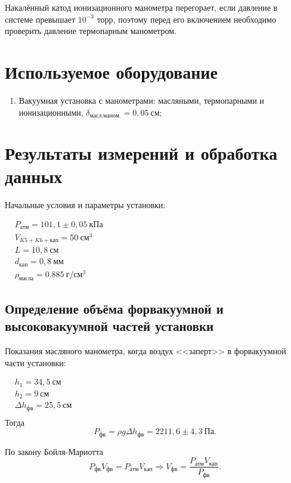 \documentclass[a4paper, 12pt]{article}
\begin{document}
  Накалённый катод ионизационного манометра перегорает, если давление в системе превышает $10^{-3}$ торр, поэтому перед его включением необходимо проверить давление термопарным манометром. \\


\section{Используемое оборудование}

\begin{enumerate}
    \item Вакуумная установка с манометрами: масляными, термопарными и ионизационными, $\delta_{масл. маном.} = 0,05~см$;
\end{enumerate}

\section{Результаты измерений и обработка данных}

Начальные условия и параметры установки:

$\begin{aligned}
& P_{\text{атм}} = 101,1\pm0,05~кПа\\
& V_{K5+K6+кап} = 50~см^3 \\
& L = 10,8~см \\
& d_{кап} = 0,8~мм \\
& \rho_{масла} = 0.885~г/см^3
\end{aligned}$\\[0,5 cm]

\subsection{Определение объёма форвакуумной и высоковакуумной частей установки}

Показания масляного манометра, когда воздух <<заперт>> в форвакуумной части установки:

$\begin{aligned}
& h_1 = 34,5~см \\
& h_2 = 9~см \\
& \Delta{h_{фв}} = 25,5~см \\
\end{aligned}$\\[0,5 cm]

Тогда
\[P_{фв} = \rho g\Delta{h_{фв}} = 2211,6\pm4,3~Па.\]

По закону Бойля-Мариотта
\[P_{фв}V_{фв} = P_{атм}V_{кап} \Rightarrow V_{фв} = \frac{P_{атм}V_{кап}}{P_{фв}}.\]
\end{document}
